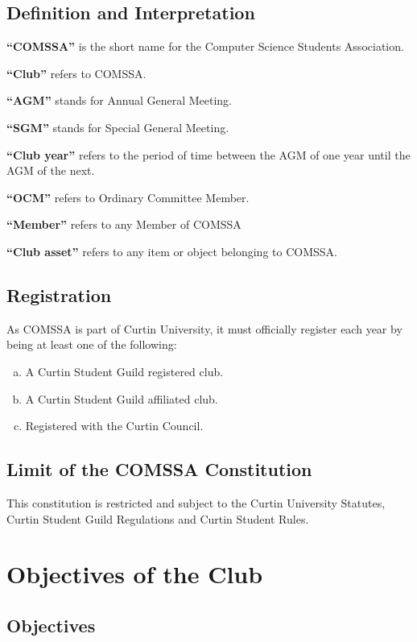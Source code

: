 \documentclass[a4paper,12pt]{article}
\begin{document}
\subsection{Definition and Interpretation}

\textbf{``COMSSA''} is the short name for the Computer Science Students Association.

\textbf{``Club''} refers to COMSSA.

\textbf{``AGM''} stands for Annual General Meeting.

\textbf{``SGM''} stands for Special General Meeting.

\textbf{``Club year''} refers to the period of time between the AGM of one year until the AGM of the next.

\textbf{``OCM''} refers to Ordinary Committee Member.

\textbf{``Member''} refers to any Member of COMSSA

\textbf{``Club asset''} refers to any item or object belonging to COMSSA.

\subsection{Registration}

As COMSSA is part of Curtin University, it must officially register each year by being at least one of the following:

\begin{enumerate}[a)]
	\item A Curtin Student Guild registered club.
	\item A Curtin Student Guild affiliated club.
	\item Registered with the Curtin Council.
\end{enumerate}

\subsection{Limit of the COMSSA Constitution}

This constitution is restricted and subject to the Curtin University Statutes, Curtin Student Guild Regulations and Curtin Student Rules.

\section{Objectives of the Club}

\subsection{Objectives}
\end{document}
